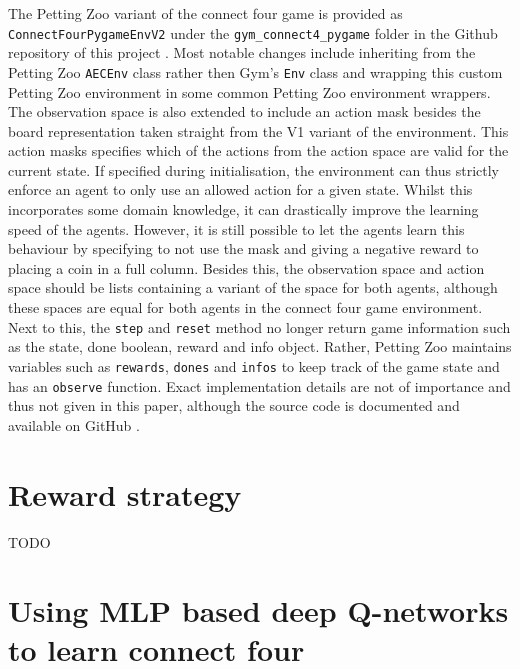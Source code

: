 The Petting Zoo variant of the connect four game is provided as \texttt{ConnectFourPygameEnvV2} under the \texttt{gym\_connect4\_pygame} folder in the Github repository of this project \citep{github_project}.  
Most notable changes include inheriting from the Petting Zoo \texttt{AECEnv} class rather then Gym's \texttt{Env} class and wrapping this custom Petting Zoo environment in some common Petting Zoo environment wrappers. 
The observation space is also extended to include an action mask besides the board representation taken straight from the V1 variant of the environment.
This action masks specifies which of the actions from the action space are valid for the current state.
If specified during initialisation, the environment can thus strictly enforce an agent to only use an allowed action for a given state.
Whilst this incorporates some domain knowledge, it can drastically improve the learning speed of the agents.
However, it is still possible to let the agents learn this behaviour by specifying to not use the mask and giving a negative reward to placing a coin in a full column.
Besides this, the observation space and action space should be lists containing a variant of the space for both agents, although these spaces are equal for both agents in the connect four game environment.
Next to this, the \texttt{step} and \texttt{reset} method no longer return game information such as the state, done boolean, reward and info object.
Rather, Petting Zoo maintains variables such as \texttt{rewards}, \texttt{dones} and \texttt{infos} to keep track of the game state and has an \texttt{observe} function.
Exact implementation details are not of importance and thus not given in this paper, although the source code is documented and available on GitHub \citep{github_project}.


\section{Reward strategy}
\label{sec:connect_four_rl-rewards}

TODO


\section{Using MLP based deep Q-networks to learn connect four}
\label{sec:connect_four_rl-mlp-dqn}

